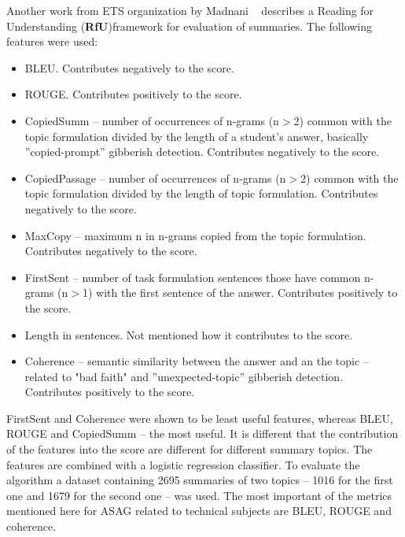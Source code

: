 Another work from ETS organization by Madnani ~\cite{Madnani} describes a Reading for Understanding (\textbf{RfU})framework  for evaluation of summaries. The following features were used: 
\begin{itemize}
\item BLEU. Contributes negatively to the score.
\item ROUGE. Contributes positively to the score.
\item CopiedSumm -- number of occurrences of n-grams (n$>$2) common with the topic formulation divided by the length of a student's answer, basically ”copied-prompt” gibberish detection. Contributes negatively to the score.
\item CopiedPassage -- number of occurrences of n-grams (n$>$2) common with the topic formulation divided by the length of topic formulation. Contributes negatively to the score.
\item MaxCopy -- maximum n in n-grams copied from the topic formulation. Contributes negatively to the score.
\item FirstSent -- number of task formulation sentences those have common n-grams (n$>$1) with the first sentence of the answer. Contributes positively to the score.
\item Length in sentences. Not mentioned how it contributes to the score.
\item Coherence -- semantic similarity between the answer and an the topic -- related to "bad faith" and ”unexpected-topic” gibberish detection. Contributes positively to the score.
\end{itemize}

FirstSent and Coherence were shown to be least useful features, whereas BLEU, ROUGE and CopiedSumm -- the most useful. It is different that the contribution of the features into the score are different for different summary topics. The features are combined with a logistic regression classifier. To evaluate the algorithm a dataset containing 2695 summaries of two topics -- 1016 for the first one and 1679 for the second one -- was used. The most important of the metrics mentioned here for ASAG related to technical subjects are BLEU, ROUGE and coherence.\\

